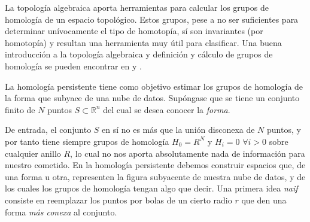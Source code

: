 \documentclass[12pt,a4paper,twoside]{article} %
\theoremstyle{plain}
\theoremstyle{definition}
\newcommand{\R}{\mathbb{R}}
\begin{document}
%
%

La topología algebraica aporta herramientas para calcular los grupos de homología de un espacio topológico. Estos grupos, pese a no ser suficientes para determinar unívocamente el tipo de homotopía, sí son invariantes (por homotopía) y resultan una herramienta muy útil para clasificar. Una buena introducción a la topología algebraica y definición y cálculo de grupos de homología se pueden encontrar en \cite{Navarro} y \cite{Hatcher}.

La homología persistente tiene como objetivo estimar los grupos de homología de la forma que subyace de una nube de datos. Supóngase que se tiene un conjunto finito de $N$ puntos $S \subset\R^n$ del cual se desea conocer la \emph{forma}.

De entrada, el conjunto $S$ en sí no es más que la unión disconexa de $N$ puntos, y por tanto tiene siempre grupos de homología $H_0=R^N$ y $H_i=0$ $\forall i > 0$ sobre cualquier anillo $R$, lo cual no nos aporta absolutamente nada de información para nuestro cometido. En la homología persistente debemos construir espacios que, de una forma u otra, representen la figura subyacente de nuestra nube de datos, y de los cuales los grupos de homología tengan algo que decir. Una primera idea \emph{naif} consiste en reemplazar los puntos por bolas de un cierto radio $r$ que den una forma \emph{más conexa} al conjunto.
\end{document}
